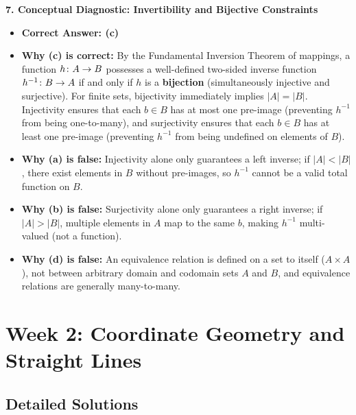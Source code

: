 \textbf{7. Conceptual Diagnostic: Invertibility and Bijective Constraints}
\begin{itemize}
    \item \textbf{Correct Answer: (c)}
    \item \textbf{Why (c) is correct:} By the Fundamental Inversion Theorem of mappings, a function $h \colon A \to B$ possesses a well-defined two-sided inverse function $h^{-1} \colon B \to A$ if and only if $h$ is a \textbf{bijection} (simultaneously injective and surjective). For finite sets, bijectivity immediately implies $|A| = |B|$. Injectivity ensures that each $b \in B$ has at most one pre-image (preventing $h^{-1}$ from being one-to-many), and surjectivity ensures that each $b \in B$ has at least one pre-image (preventing $h^{-1}$ from being undefined on elements of $B$).
    \item \textbf{Why (a) is false:} Injectivity alone only guarantees a left inverse; if $|A| < |B|$, there exist elements in $B$ without pre-images, so $h^{-1}$ cannot be a valid total function on $B$.
    \item \textbf{Why (b) is false:} Surjectivity alone only guarantees a right inverse; if $|A| > |B|$, multiple elements in $A$ map to the same $b$, making $h^{-1}$ multi-valued (not a function).
    \item \textbf{Why (d) is false:} An equivalence relation is defined on a set to itself ($A \times A$), not between arbitrary domain and codomain sets $A$ and $B$, and equivalence relations are generally many-to-many.
\end{itemize}

\section*{Week 2: Coordinate Geometry and Straight Lines}

\subsection*{Detailed Solutions}

